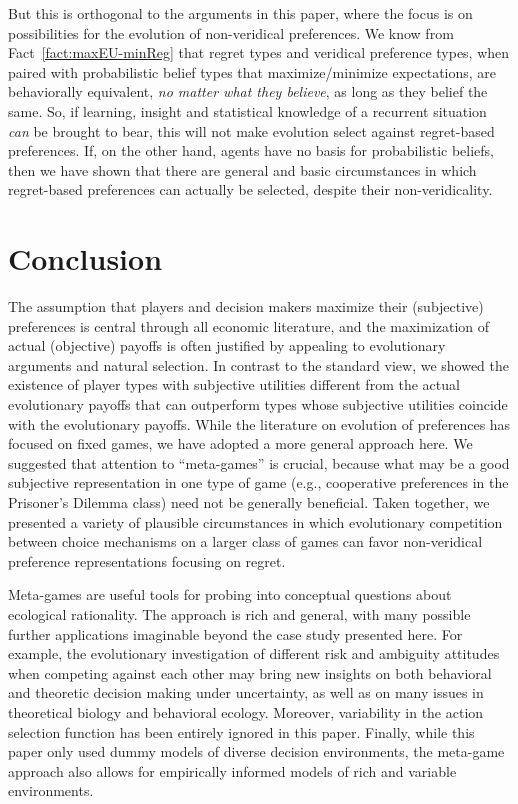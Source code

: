 \documentclass[fleqn,reqno,12pt]{article}
\theoremstyle{Satz}
\theoremstyle{Bsp}
\begin{document}
But this is orthogonal to the arguments in this paper, where the focus is on possibilities for
the evolution of non-veridical preferences. We know from Fact~\ref{fact:maxEU-minReg} that
regret types and veridical preference types, when paired with probabilistic belief types that
maximize/minimize expectations, are behaviorally equivalent, \emph{no matter what they believe},
as long as they belief the same. So, if learning, insight and statistical knowledge of a
recurrent situation \emph{can} be brought to bear, this will not make evolution select against
regret-based preferences. If, on the other hand, agents have no basis for probabilistic
beliefs, then we have shown that there are general and basic circumstances in which
regret-based preferences can actually be selected, despite their non-veridicality.
\fi


\section{Conclusion} \label{sec:conclusion}


The assumption that players and decision makers maximize their (subjective) preferences is central through all economic literature, and the maximization of actual (objective) payoffs is often justified by appealing to evolutionary arguments and natural
selection. In contrast to the standard view, we showed the
existence of player types with subjective utilities different
from the actual evolutionary payoffs that can outperform types whose
subjective utilities coincide with the evolutionary payoffs.
While the literature on evolution of preferences has focused
on fixed games, we have adopted a
more general approach here. We suggested that attention
to “meta-games” is crucial, because what may be a good
subjective representation in one type of game (e.g., cooperative preferences in the Prisoner’s Dilemma class) need not
be generally beneficial. Taken together, we presented a variety of plausible circumstances in which evolutionary competition between choice
mechanisms on a larger class of games can favor non-veridical preference representations focusing on regret.

Meta-games are useful tools for probing into conceptual questions about ecological
rationality. The approach is rich and general, with many possible further
applications imaginable beyond the case study presented here. For example, the evolutionary
investigation of different risk and ambiguity attitudes when competing against each other may bring new insights on both behavioral and theoretic
decision making under uncertainty, as well as on many issues in theoretical biology and
behavioral ecology. Moreover, variability in the action selection function has been entirely
ignored in this paper. Finally, while this paper only used dummy models of diverse decision
environments, the meta-game approach also allows for empirically informed models of rich and
variable environments.
\end{document}
